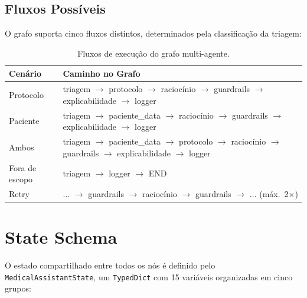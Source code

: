 \subsection{Fluxos Possíveis}

O grafo suporta cinco fluxos distintos, determinados pela classificação da triagem:

\begin{table}[H]
\centering
\caption{Fluxos de execução do grafo multi-agente.}
\label{tab:fluxos_grafo}
\small
\begin{tabularx}{\textwidth}{l X}
\toprule
\textbf{Cenário} & \textbf{Caminho no Grafo} \\
\midrule
Protocolo & triagem $\rightarrow$ protocolo $\rightarrow$ raciocínio $\rightarrow$ guardrails $\rightarrow$ explicabilidade $\rightarrow$ logger \\
Paciente & triagem $\rightarrow$ paciente\_data $\rightarrow$ raciocínio $\rightarrow$ guardrails $\rightarrow$ explicabilidade $\rightarrow$ logger \\
Ambos & triagem $\rightarrow$ paciente\_data $\rightarrow$ protocolo $\rightarrow$ raciocínio $\rightarrow$ guardrails $\rightarrow$ explicabilidade $\rightarrow$ logger \\
Fora de escopo & triagem $\rightarrow$ logger $\rightarrow$ END \\
Retry & $\ldots$ $\rightarrow$ guardrails $\rightarrow$ raciocínio $\rightarrow$ guardrails $\rightarrow$ $\ldots$ (máx.\ 2$\times$) \\
\bottomrule
\end{tabularx}
\end{table}

\section{State Schema}\label{sec:state}

O estado compartilhado entre todos os nós é definido pelo \texttt{MedicalAssistantState}, um \texttt{TypedDict} com 15 variáveis organizadas em cinco grupos:

